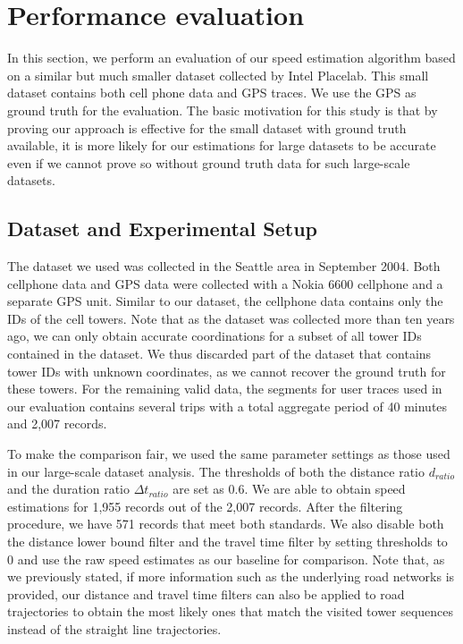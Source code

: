 \section{Performance evaluation}
\label{evaluation}

In this section, 
we perform an evaluation of our speed estimation algorithm  
based on a similar but much smaller dataset \cite{intel-placelab-20041217} collected by Intel Placelab. 
This small dataset contains both cell phone data and GPS traces. 
We use the GPS as ground truth for the evaluation. The basic motivation for this study is that by proving our approach is effective for the small dataset with ground truth available, it is more likely for our estimations for large datasets to be accurate even if we cannot prove so without ground truth data for such large-scale datasets. 

\subsection{Dataset and Experimental Setup}

The dataset we used was collected in the Seattle area in September 2004. Both cellphone data and GPS data were collected with a Nokia 6600 cellphone and a separate GPS unit. Similar to our dataset, the cellphone data contains only the IDs of the cell towers. Note that as the dataset was collected more than ten years ago, we can only obtain accurate coordinations for a subset of all tower IDs contained in the dataset. We thus discarded part of the dataset that contains tower IDs with unknown coordinates, as we cannot recover the ground truth for these towers. For the remaining valid data, the segments for user traces used in our evaluation contains several trips with a total aggregate period of 40 minutes and 2,007 records.

To make the comparison fair, we used the same parameter settings as those used in our large-scale dataset analysis. The thresholds of both the distance ratio $d_{ratio}$ and the duration ratio $\Delta t_{ratio}$ are set as 0.6. We are able to obtain speed estimations for 1,955 records out of the 2,007 records. After the filtering procedure, we have 571 records that meet both standards. We also disable both the distance lower bound filter and the travel time filter by setting thresholds to 0 and use the raw speed estimates as our baseline for comparison. Note that, as we previously stated, if more information such as the underlying road networks is provided, our distance and travel time filters can also be applied to road trajectories to obtain the most likely ones that match the visited tower sequences instead of the straight line trajectories.

